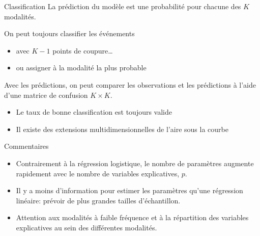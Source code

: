 \documentclass[
  ignorenonframetext,
]{beamer}
\providecommand{\tightlist}{%
  \setlength{\itemsep}{0pt}\setlength{\parskip}{0pt}}\usepackage{longtable,booktabs,array}
\begin{document}
\begin{frame}{Classification}
\protect\hypertarget{classification}{}
La prédiction du modèle est une probabilité pour chacune des \(K\)
modalités.

On peut toujours classifier les événements

\begin{itemize}
\tightlist
\item
  avec \(K-1\) points de coupure\ldots{}
\item
  ou assigner à la modalité la plus probable
\end{itemize}

Avec les prédictions, on peut comparer les observations et les
prédictions à l'aide d'une matrice de confusion \(K \times K\).

\begin{itemize}
\tightlist
\item
  Le taux de bonne classification est toujours valide
\item
  Il existe des extensions multidimensionnelles de l'aire sous la courbe
\end{itemize}
\end{frame}

\begin{frame}{Commentaires}
\protect\hypertarget{commentaires}{}
\begin{itemize}
\tightlist
\item
  Contrairement à la régression logistique, le nombre de paramètres
  augmente rapidement avec le nombre de variables explicatives, \(p\).
\item
  Il y a moins d'information pour estimer les paramètres qu'une
  régression linéaire: prévoir de plus grandes tailles d'échantillon.
\item
  Attention aux modalités à faible fréquence et à la répartition des
  variables explicatives au sein des différentes modalités.
\end{itemize}
\end{frame}
\end{document}
